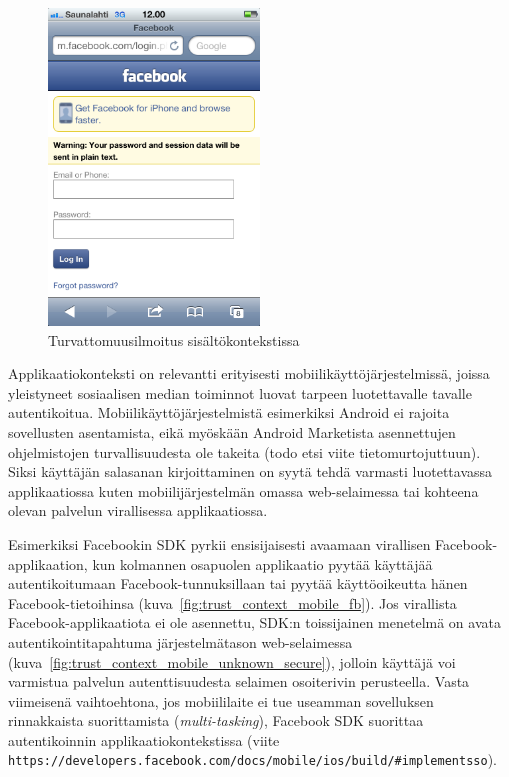 \documentclass[finnish,gradu]{tktltiki}
\begin{document}
  \begin{figure}
    \centering
    \includegraphics[width=0.5\textwidth]{images/trust_context_html_unsecure.png}
    \caption{Turvattomuusilmoitus sisältökontekstissa}
    \label{fig:trust_context_html_unsecure}
  \end{figure}


  Applikaatiokonteksti on relevantti erityisesti mobiilikäyttöjärjestelmissä, joissa yleistyneet sosiaalisen median toiminnot luovat tarpeen luotettavalle tavalle autentikoitua. Mobiilikäyttöjärjestelmistä esimerkiksi Android ei rajoita sovellusten asentamista, eikä myöskään Android Marketista asennettujen ohjelmistojen turvallisuudesta ole takeita (todo etsi viite tietomurtojuttuun). Siksi käyttäjän salasanan kirjoittaminen on syytä tehdä varmasti luotettavassa applikaatiossa kuten mobiilijärjestelmän omassa web-selaimessa tai kohteena olevan palvelun virallisessa applikaatiossa.

  Esimerkiksi Facebookin SDK pyrkii ensisijaisesti avaamaan virallisen Facebook-applikaation, kun kolmannen osapuolen applikaatio pyytää käyttäjää autentikoitumaan Facebook-tunnuksillaan tai pyytää käyttöoikeutta hänen Facebook-tietoihinsa (kuva~\ref{fig:trust_context_mobile_fb}). Jos virallista Facebook-applikaatiota ei ole asennettu, SDK:n toissijainen menetelmä on avata autentikointitapahtuma järjestelmätason web-selaimessa (kuva~\ref{fig:trust_context_mobile_unknown_secure}), jolloin käyttäjä voi varmistua palvelun autenttisuudesta selaimen osoiterivin perusteella. Vasta viimeisenä vaihtoehtona, jos mobiililaite ei tue useamman sovelluksen rinnakkaista suorittamista (\emph{multi-tasking}), Facebook SDK suorittaa autentikoinnin applikaatiokontekstissa (viite \verb=https://developers.facebook.com/docs/mobile/ios/build/#implementsso=).
\end{document}
